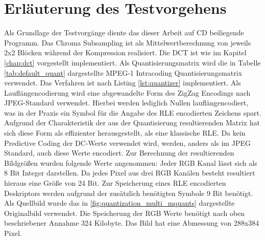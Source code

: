 \chapter{Erläuterung des Testvorgehens}

Als Grundlage der Testvorgänge diente das dieser Arbeit auf CD beiliegende Programm. Das Chroma Subsampling ist als Mittelwertberechnung von jeweils 2x2 Blöcken während der Kompression realisiert. Die DCT ist wie im Kapitel \ref{chap:dct} vorgestellt implementiert. Als Quantisierungsmatrix wird die in Tabelle \ref{tab:default_quant} dargestellte MPEG-1 Intracoding Quantisierungsmatrix verwendet. Das Verfahren ist nach Listing \ref{lst:quantizer} implementiert. Als Lauflängencodierung wird eine abgewandelte Form des ZigZag Encodings nach JPEG-Standard verwendet. Hierbei werden lediglich Nullen lauflängencodiert, was in der Praxis ein Symbol für die Angabe des RLE encodierten Zeichens spart. Aufgrund der Charakteristik der aus der Quantisierung resultierenden Matrix hat sich diese Form als effizienter herausgestellt, als eine klassische RLE. Da kein Predictive Coding der DC-Werte verwendet wird, werden, anders als im JPEG Standard, auch diese Werte encodiert. Zur Berechnung der resultierenden Bildgrößen wurden folgende Werte angenommen: Jeder RGB Kanal lässt sich als 8 Bit Integer darstellen. Da jedes Pixel aus drei RGB Kanälen besteht resultiert hieraus eine Größe von 24 Bit. Zur Speicherung eines RLE encodierten Deskriptors werden aufgrund der zusätzlich benötigten Symbole 9 Bit benötigt. Als Quellbild wurde das in \ref{fig:quantization_multi_mquants} dargestellte Originalbild verwendet. Die Speicherung der RGB Werte benötigt nach oben beschriebener Annahme 324 Kilobyte. Das Bild hat eine Abmessung von 288x384 Pixel.
